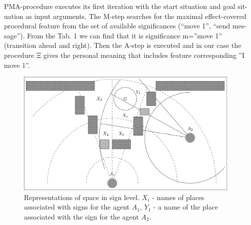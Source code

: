 \documentclass[runningheads,a4paper]{llncs}
\begin{document}
PMA-procedure executes its first iteration with the start situation and goal sit-uation as input arguments. The M-step searches for the maximal effect-covered procedural feature from the set of available significances (``move 1'', ``send mes-sage''). From the Tab. 1 we can find that it is significance m=''move 1'' (transition ahead and right). Then the A-step is executed and in our case the procedure Ξ gives the personal meaning that includes feature corresponding ''I move 1''.


\begin{figure}
	\centering
	\includegraphics[height=6cm]{rita_ex_proc}
	\caption{Representations of space in sign level. $X_i$ - names of places associated with signs for the agent $A_1$, $Y_1$ - a name of the place associated with the sign for the agent $A_2$.}
	\label{fig:example}
\end{figure}
\end{document}
